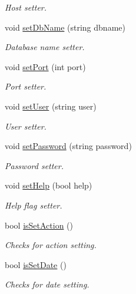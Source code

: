 \begin{DoxyCompactItemize}
\begin{DoxyCompactList}\small\item\em Host setter. \end{DoxyCompactList}\item 
void \hyperlink{classfwi_1_1CommandLineArguments_a624d5a4997b520083b32f589674f4e58}{set\-Db\-Name} (string dbname)
\begin{DoxyCompactList}\small\item\em Database name setter. \end{DoxyCompactList}\item 
void \hyperlink{classfwi_1_1CommandLineArguments_ab283ed9c1d605308f9df2381ec53340e}{set\-Port} (int port)
\begin{DoxyCompactList}\small\item\em Port setter. \end{DoxyCompactList}\item 
void \hyperlink{classfwi_1_1CommandLineArguments_aba8081f570985fba7c0746e4152857a1}{set\-User} (string user)
\begin{DoxyCompactList}\small\item\em User setter. \end{DoxyCompactList}\item 
void \hyperlink{classfwi_1_1CommandLineArguments_af865288c92229fd879333c1d22770f13}{set\-Password} (string password)
\begin{DoxyCompactList}\small\item\em Password setter. \end{DoxyCompactList}\item 
void \hyperlink{classfwi_1_1CommandLineArguments_ab5e55eda6e153cfb3db823366ad72605}{set\-Help} (bool help)
\begin{DoxyCompactList}\small\item\em Help flag setter. \end{DoxyCompactList}\item 
bool \hyperlink{classfwi_1_1CommandLineArguments_a6a2c57edc3311bf3555b6b0a030915e1}{is\-Set\-Action} ()
\begin{DoxyCompactList}\small\item\em Checks for action setting. \end{DoxyCompactList}\item 
bool \hyperlink{classfwi_1_1CommandLineArguments_a582c389cc309b4973a6565dcf5647af3}{is\-Set\-Date} ()
\begin{DoxyCompactList}\small\item\em Checks for date setting. \end{DoxyCompactList}\item 

\end{DoxyCompactItemize}
